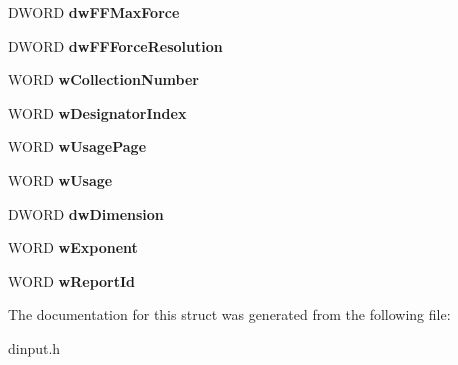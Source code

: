 \begin{DoxyCompactItemize}
\item 
\hypertarget{struct_d_i_d_e_v_i_c_e_o_b_j_e_c_t_i_n_s_t_a_n_c_e_w_a0e709965bc21164382c75e261816ab9e}{D\-W\-O\-R\-D {\bfseries dw\-F\-F\-Max\-Force}}\label{struct_d_i_d_e_v_i_c_e_o_b_j_e_c_t_i_n_s_t_a_n_c_e_w_a0e709965bc21164382c75e261816ab9e}

\item 
\hypertarget{struct_d_i_d_e_v_i_c_e_o_b_j_e_c_t_i_n_s_t_a_n_c_e_w_a66ff7820923b0b9bd4690c436dd96df4}{D\-W\-O\-R\-D {\bfseries dw\-F\-F\-Force\-Resolution}}\label{struct_d_i_d_e_v_i_c_e_o_b_j_e_c_t_i_n_s_t_a_n_c_e_w_a66ff7820923b0b9bd4690c436dd96df4}

\item 
\hypertarget{struct_d_i_d_e_v_i_c_e_o_b_j_e_c_t_i_n_s_t_a_n_c_e_w_aac38309e13ae6ffa946d108e3518ebff}{W\-O\-R\-D {\bfseries w\-Collection\-Number}}\label{struct_d_i_d_e_v_i_c_e_o_b_j_e_c_t_i_n_s_t_a_n_c_e_w_aac38309e13ae6ffa946d108e3518ebff}

\item 
\hypertarget{struct_d_i_d_e_v_i_c_e_o_b_j_e_c_t_i_n_s_t_a_n_c_e_w_ace891758c10c2a5d1977964a2cff74eb}{W\-O\-R\-D {\bfseries w\-Designator\-Index}}\label{struct_d_i_d_e_v_i_c_e_o_b_j_e_c_t_i_n_s_t_a_n_c_e_w_ace891758c10c2a5d1977964a2cff74eb}

\item 
\hypertarget{struct_d_i_d_e_v_i_c_e_o_b_j_e_c_t_i_n_s_t_a_n_c_e_w_a6582de6cd65e43702101065ff405be50}{W\-O\-R\-D {\bfseries w\-Usage\-Page}}\label{struct_d_i_d_e_v_i_c_e_o_b_j_e_c_t_i_n_s_t_a_n_c_e_w_a6582de6cd65e43702101065ff405be50}

\item 
\hypertarget{struct_d_i_d_e_v_i_c_e_o_b_j_e_c_t_i_n_s_t_a_n_c_e_w_a288c9b0faab95ea398b2b947a8d19dac}{W\-O\-R\-D {\bfseries w\-Usage}}\label{struct_d_i_d_e_v_i_c_e_o_b_j_e_c_t_i_n_s_t_a_n_c_e_w_a288c9b0faab95ea398b2b947a8d19dac}

\item 
\hypertarget{struct_d_i_d_e_v_i_c_e_o_b_j_e_c_t_i_n_s_t_a_n_c_e_w_acbe2d38d1a76578c805c52b167c05481}{D\-W\-O\-R\-D {\bfseries dw\-Dimension}}\label{struct_d_i_d_e_v_i_c_e_o_b_j_e_c_t_i_n_s_t_a_n_c_e_w_acbe2d38d1a76578c805c52b167c05481}

\item 
\hypertarget{struct_d_i_d_e_v_i_c_e_o_b_j_e_c_t_i_n_s_t_a_n_c_e_w_aabc74cbb26f0e29e739bec9ecec222d4}{W\-O\-R\-D {\bfseries w\-Exponent}}\label{struct_d_i_d_e_v_i_c_e_o_b_j_e_c_t_i_n_s_t_a_n_c_e_w_aabc74cbb26f0e29e739bec9ecec222d4}

\item 
\hypertarget{struct_d_i_d_e_v_i_c_e_o_b_j_e_c_t_i_n_s_t_a_n_c_e_w_a91e2ebc9ed8e4661d560010e2c0eaa71}{W\-O\-R\-D {\bfseries w\-Report\-Id}}\label{struct_d_i_d_e_v_i_c_e_o_b_j_e_c_t_i_n_s_t_a_n_c_e_w_a91e2ebc9ed8e4661d560010e2c0eaa71}

\end{DoxyCompactItemize}


The documentation for this struct was generated from the following file\-:\begin{DoxyCompactItemize}
\item 
dinput.\-h\end{DoxyCompactItemize}
